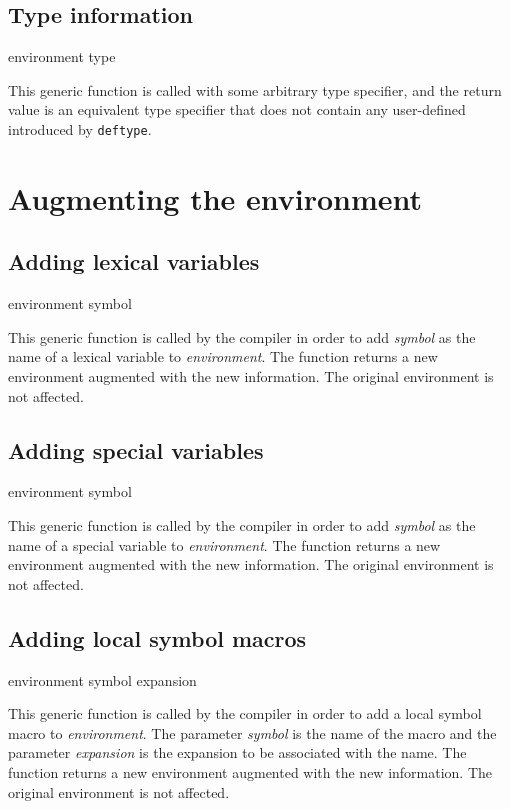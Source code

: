 \subsection{Type information}

 {environment type}

This generic function is called with some arbitrary type specifier,
and the return value is an equivalent type specifier that does not
contain any user-defined introduced by \texttt{deftype}. 

\section{Augmenting the environment}
\label{sec-environment-augmenting}

\subsection{Adding lexical variables}

 {environment symbol}

This generic function is called by the compiler in order to add
\textit{symbol} as the name of a lexical variable to
\textit{environment}.  The function returns a new environment
augmented with the new information.  The original environment is not
affected.

\subsection{Adding special variables}

 {environment symbol}

This generic function is called by the compiler in order to add
\textit{symbol} as the name of a special variable to
\textit{environment}.  The function returns a new environment
augmented with the new information.  The original environment is not
affected.

\subsection{Adding local symbol macros}

 {environment symbol expansion}

This generic function is called by the compiler in order to add a
local symbol macro to \textit{environment}.  The parameter
\textit{symbol} is the name of the macro and the parameter
\textit{expansion} is the expansion to be associated with the name.
The function returns a new environment augmented with the new
information.  The original environment is not affected.

